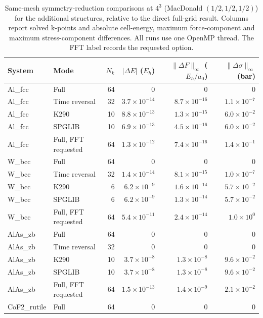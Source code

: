 \begin{table}[htbp]
\centering\small\setlength{\tabcolsep}{4pt}
\caption{Same-mesh symmetry-reduction comparisons at $4^3$ (MacDonald $(1/2,1/2,1/2)$) for the additional structures, relative to the direct full-grid result. Columns report solved k-points and absolute cell-energy, maximum force-component and maximum stress-component differences. All runs use one OpenMP thread. The FFT label records the requested option.}
\label{tab:symmetry-validation-additional}
\begin{tabular}{llrrrr}
\toprule
System & Mode & $N_k$ & $|\Delta E|$ ($E_h$) & $\|\Delta F\|_\infty$ ($E_h/a_0$) & $\|\Delta\sigma\|_\infty$ (bar) \\
\midrule
Al\_fcc & Full & 64 & $0$ & $0$ & $0$ \\
Al\_fcc & Time reversal & 32 & $3.7\times10^{-14}$ & $8.7\times10^{-16}$ & $1.1\times10^{-7}$ \\
Al\_fcc & K290 & 10 & $8.8\times10^{-13}$ & $1.3\times10^{-15}$ & $6.0\times10^{-2}$ \\
Al\_fcc & SPGLIB & 10 & $6.9\times10^{-13}$ & $4.5\times10^{-16}$ & $6.0\times10^{-2}$ \\
Al\_fcc & Full, FFT requested & 64 & $1.3\times10^{-12}$ & $7.4\times10^{-16}$ & $1.4\times10^{-1}$ \\
W\_bcc & Full & 64 & $0$ & $0$ & $0$ \\
W\_bcc & Time reversal & 32 & $1.4\times10^{-14}$ & $8.1\times10^{-15}$ & $1.0\times10^{-7}$ \\
W\_bcc & K290 & 6 & $6.2\times10^{-9}$ & $1.6\times10^{-14}$ & $5.7\times10^{-2}$ \\
W\_bcc & SPGLIB & 6 & $6.2\times10^{-9}$ & $1.3\times10^{-14}$ & $5.7\times10^{-2}$ \\
W\_bcc & Full, FFT requested & 64 & $5.4\times10^{-11}$ & $2.4\times10^{-14}$ & $1.0\times10^{0}$ \\
AlAs\_zb & Full & 64 & $0$ & $0$ & $0$ \\
AlAs\_zb & Time reversal & 32 & $0$ & $0$ & $0$ \\
AlAs\_zb & K290 & 10 & $3.7\times10^{-8}$ & $1.3\times10^{-8}$ & $9.6\times10^{-2}$ \\
AlAs\_zb & SPGLIB & 10 & $3.7\times10^{-8}$ & $1.3\times10^{-8}$ & $9.6\times10^{-2}$ \\
AlAs\_zb & Full, FFT requested & 64 & $1.5\times10^{-13}$ & $1.4\times10^{-9}$ & $2.1\times10^{-2}$ \\
CoF2\_rutile & Full & 64 & $0$ & $0$ & $0$ \\

\end{tabular}
\end{table}
